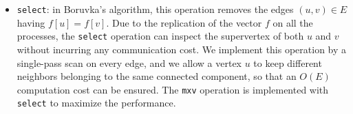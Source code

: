 \documentclass{sokendai_thesis} %
\newcommand{\boruvka}[0]{Boruvka}
\begin{document}
\begin{itemize}

\item \texttt{select}: in \boruvka{}'s algorithm, this operation removes the edges $(u, v)\in E$ having $f[u]=f[v]$.
Due to the replication of the vector $f$ on all the processes, the \texttt{select} operation can inspect the supervertex of both $u$ and $v$ without incurring any communication cost.
We implement this operation by a single-pass scan on every edge, and we allow a vertex $u$ to keep different neighbors belonging to the same connected component, so that an $O(E)$ computation cost can be ensured.
The \texttt{mxv} operation is implemented with \texttt{select} to maximize the performance.
\end{itemize}

\end{document}
